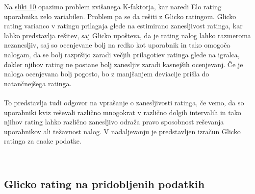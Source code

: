 \documentclass{IEEEtran}
\makeatletter
\let\old@subsection\subsection
\renewcommand{\subsection}[1]{\bigskip\old@subsection{#1}\@afterindentfalse\@afterheading}
\makeatother
\begin{document}
Na \hyperref[fig:uexse]{sliki 10} opazimo problem zvišanega K-faktorja, kar naredi Elo rating uporabnika zelo variabilen. Problem pa se da rešiti z Glicko ratingom. Glicko rating varianco v ratingu prilagaja glede na estimirano zanesljivost ratinga, kar lahko predstavlja rešitev, saj Glicko upošteva, da je rating nalog lahko razmeroma nezanesljiv, saj so ocenjevane bolj na redko kot uporabnik in tako omogoča nalogam, da se bolj razpršijo zaradi večjih prilagotiev ratinga glede na igralca, dokler njihov rating ne postane bolj zanesljiv zaradi kasnejših ocenjevanj. Če je naloga ocenjevana bolj pogosto, bo z manjšanjem deviacije prišla do natančnejšega ratinga. 
\hfill
\\
\\
To predstavlja tudi odgovor na vprašanje o zanesljivosti ratinga, če vemo, da so uporabniki kviz reševali različno mnogokrat v različno dolgih intervalih
in tako njihov rating lahko različno zanesljivo odraža pravo sposobnost reševanja uporabnikov ali težavnost nalog. V nadaljevanju je predstavljen
izračun Glicko ratinga za enake podatke.

\hfill
\\

\newpage
\subsection{Glicko rating na pridobljenih podatkih}
\label{sec:glicko}
\end{document}
